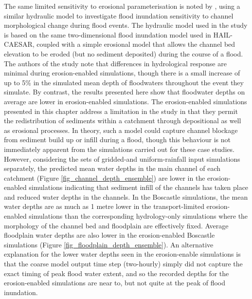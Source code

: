 The same limited sensitivity to erosional parameterisation is noted by \citep{wong2015sensitivity}, using a similar hydraulic model to investigate flood inundation sensitivity to channel morphological change during flood events. The hydraulic model used in the \citet{wong2015sensitivity} study is based on the same two-dimensional flood inundation model used in HAIL-CAESAR, coupled with a simple erosional model that allows the channel bed elevation to be eroded (but no sediment deposited) during the course of a flood. The authors of the study note that differences in hydrological response are minimal during erosion-enabled simulations, though there is a small increase of up to 5\% in the simulated mean depth of floodwaters throughout the event they simulate. By contrast, the results presented here show that floodwater depths on average are lower in erosion-enabled simulations. The erosion-enabled simulations presented in this chapter address a limitation in the \citet{wong2015sensitivty} study in that they permit the redistribution of sediments within a catchment through depositional as well as erosional processes.  In theory, such a model could capture channel blockage from sediment build up or infill during a flood, though this behaviour is not immediately apparent from the simulations carried out for these case studies. However, considering the sets of gridded-and uniform-rainfall input simulations separately, the predicted mean water depths in the main channel of each catchment (Figure \ref{fig_channel_depth_ensemble}) are lower in the erosion-enabled simulations indicating that sediment infill of the channels has taken place and reduced water depths in the channels. In the Boscastle simulations, the mean water depths are as much as 1 metre lower in the transport-limited erosion-enabled simulations than the corresponding hydrology-only simulations where the morphology of the channel bed and floodplain are effectively fixed. Average floodplain water depths are also lower in the erosion-enabled Boscastle simulations (Figure \ref{fig_floodplain_depth_ensemble}). An alternative explanation for the lower water depths seen in the erosion-enable simulations is that the coarse model output time step (two-hourly) simply did not capture the exact timing of peak flood water extent, and so the recorded depths for the erosion-enabled simulations are near to, but not quite at the peak of flood inundation.


